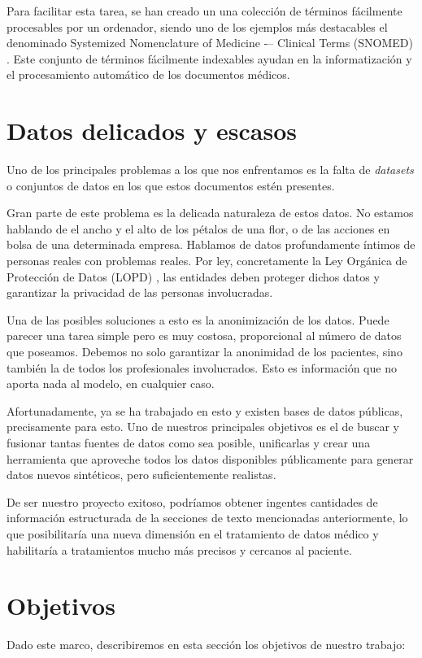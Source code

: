 Para facilitar esta tarea, se han creado un una colección de términos fácilmente procesables por un ordenador, siendo uno de los ejemplos más destacables el denominado Systemized Nomenclature of Medicine -– Clinical Terms (SNOMED) \cite{snomed}. Este conjunto de términos fácilmente indexables ayudan en la informatización y el procesamiento automático de los documentos médicos.


\section{Datos delicados y escasos}
Uno de los principales problemas a los que nos enfrentamos es la falta de \textit{datasets} o conjuntos de datos en los que estos documentos estén presentes. 

Gran parte de este problema es la delicada naturaleza de estos datos. No estamos hablando de el ancho y el alto de los pétalos de una flor, o de las acciones en bolsa de una determinada empresa. Hablamos de datos profundamente íntimos de personas reales con problemas reales. Por ley, concretamente la Ley Orgánica de Protección de Datos (LOPD) \cite{LOPD}, las entidades deben proteger dichos datos y garantizar la privacidad de las personas involucradas.

Una de las posibles soluciones a esto es la anonimización de los datos. Puede parecer una tarea simple pero es muy costosa, proporcional al número de datos que poseamos. Debemos no solo garantizar la anonimidad de los pacientes, sino también la de todos los profesionales involucrados. Esto es información que no aporta nada al modelo, en cualquier caso. 

Afortunadamente, ya se ha trabajado en esto y existen bases de datos públicas, precisamente para esto. Uno de nuestros principales objetivos es el de buscar y fusionar tantas fuentes de datos como sea posible, unificarlas y crear una herramienta que aproveche todos los datos disponibles públicamente para generar datos nuevos sintéticos, pero suficientemente realistas.

De ser nuestro proyecto exitoso, podríamos obtener ingentes cantidades de información estructurada de la secciones de texto mencionadas anteriormente, lo que posibilitaría una nueva dimensión en el tratamiento de datos médico y habilitaría a tratamientos mucho más precisos y cercanos al paciente.

\section{Objetivos}
Dado este marco, describiremos en esta sección los objetivos de nuestro trabajo:

